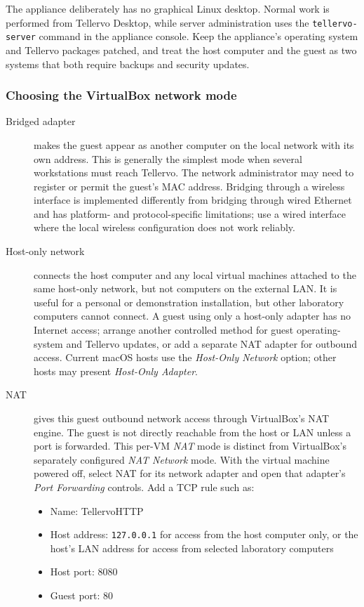 The appliance deliberately has no graphical Linux desktop. Normal work is
performed from Tellervo Desktop, while server administration uses the
\verb|tellervo-server| command in the appliance console. Keep the appliance's
operating system and Tellervo packages patched, and treat the host computer and
the guest as two systems that both require backups and security updates.

\subsubsection{Choosing the VirtualBox network mode}

\begin{description}
 \item[Bridged adapter] makes the guest appear as another computer on the local
 network with its own address. This is generally the simplest mode when several
 workstations must reach Tellervo. The network administrator may need to
 register or permit the guest's MAC address. Bridging through a wireless
 interface is implemented differently from bridging through wired Ethernet and
 has platform- and protocol-specific limitations; use a wired interface where
 the local wireless configuration does not work reliably.

\item[Host-only network] connects the host computer and any local virtual
 machines attached to the same host-only network, but not computers on the
 external LAN. It is useful for a personal or demonstration installation, but
 other laboratory computers cannot connect. A guest using only a host-only
 adapter has no Internet access; arrange another controlled method for guest
 operating-system and Tellervo updates, or add a separate NAT adapter for
 outbound access. Current macOS hosts use the \emph{Host-Only Network} option;
 other hosts may present \emph{Host-Only Adapter}.

\item[NAT] gives this guest outbound network access through VirtualBox's NAT
 engine. The guest is not directly reachable from the host or LAN unless a port
 is forwarded. This per-VM \emph{NAT} mode is distinct from VirtualBox's
 separately configured \emph{NAT Network} mode. With the virtual machine
 powered off, select NAT for its network adapter and open that adapter's
 \emph{Port Forwarding} controls. Add a TCP rule such as:

 \begin{itemize}
  \item Name: TellervoHTTP
  \item Host address: \verb|127.0.0.1| for access from the host computer only,
  or the host's LAN address for access from selected laboratory computers
  \item Host port: 8080
  \item Guest port: 80
 \end{itemize}


\end{description}
